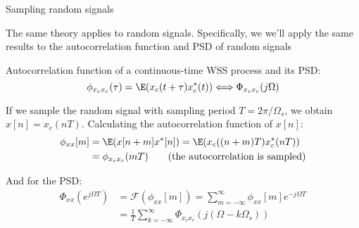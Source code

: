 \documentclass[10pt, aspectratio=169]{beamer}
\begin{document}
%
\begin{frame}{Sampling random signals}

The same theory applies to random signals. Specifically, we we'll apply the same results to the autocorrelation function and PSD of random signals

Autocorrelation function of a continuous-time WSS process and its PSD:
\begin{equation*}
\phi_{x_cx_c}(\tau) = \E(x_c(t+\tau)x_c^*(t)) \Longleftrightarrow \Phi_{x_cx_c}(j\Omega)
\end{equation*}

If we sample the random signal with sampling period $T = 2\pi/\Omega_s$, we obtain $x[n] = x_c(nT)$. Calculating the autocorrelation function of $x[n]$:
\begin{align*}
\phi_{xx}[m] &= \E(x[n+m]x^*[n]) = \E(x_c((n+m)T)x_c^*(nT)) \\
&= \phi_{x_cx_c}(mT) \tag{the autocorrelation is sampled}
\end{align*}

And for the PSD:
\begin{align*}
\Phi_{xx}(e^{j\Omega T}) &= \mathcal{F}(\phi_{xx}[m]) = \sum_{m=-\infty}^{\infty}\phi_{xx}[m]e^{-j\Omega T} \\
&= \frac{1}{T}\sum_{k=-\infty}^{\infty}\Phi_{x_cx_c}(j(\Omega-k\Omega_s)) \tag{the PSD is replicated with period $\Omega_s$}
\end{align*}

\end{frame}
\end{document}

